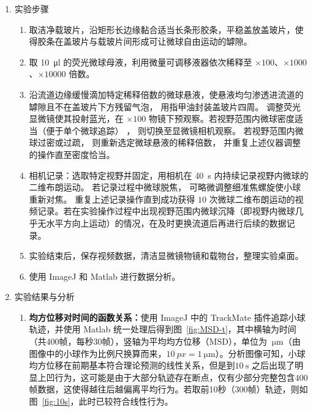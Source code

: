 \documentclass[a4paper]{article}
\begin{document}
\begin{enumerate}[label=\chinese*.,left=0pt]
    \item 实验步骤
    \begin{enumerate}[label=\arabic*.,left = 0pt]
        \item 取洁净载玻片，沿矩形长边缘黏合适当长条形胶条，平稳盖放盖玻片，使得胶条在盖玻片与载玻片间形成可让微球自由运动的罅隙。
        \item 取 \qty{10}{\micro \litre} 的荧光微球母液，利用微量可调移液器依次稀释至 $\times100$、$\times1000$、$\times10000$ 倍数。
        \item 沿流道边缘缓慢滴加特定稀释倍数的微球悬液，使悬液均匀渗透进流道的罅隙且不在盖玻片下方残留气泡， 用指甲油封装盖玻片四周。 调整荧光显微镜使其投射蓝光，在 $\times100$ 物镜下预观察。若视野范围内微球密度适当（便于单个微球追踪） ， 则切换至显微镜相机观察。 若视野范围内微球过密或过疏， 则重新选定微球悬液的稀释倍数， 并重复上述仪器调整的操作直至密度恰当。
        \item 相机记录：选取特定视野并固定，用相机在 \qty{40}{\second} 内持续记录视野内微球的二维布朗运动。 若记录过程中微球脱焦， 可略微调整细准焦螺旋使小球重新对焦。 重复上述记录操作直到成功获得 $10$ 次微球二维布朗运动的视频记录。若在实验操作过程中出现视野范围内微球沉降（即视野内微球几乎无水平方向上运动）的情况，在及时更换流道后再进行后续的数据记录。
        \item 实验结束后，保存视频数据，清洁显微镜物镜和载物台，整理实验桌面。
        \item 使用 ImageJ 和 Matlab 进行数据分析。
    \end{enumerate}

    
    \item 实验结果与分析
        \begin{enumerate}[label=\arabic*.,left = 0pt]
            \item \textbf{均方位移对时间的函数关系：}使用 ImageJ 中的 TrackMate 插件追踪小球轨迹，并使用 Matlab 统一处理后得到图~\ref{fig:MSD-t}，其中横轴为时间（共400帧，每秒30帧），竖轴为平均均方位移（MSD），单位为 $\qty{}{\micro \m}$（由图像中的小球作为比例尺换算而来，$\qty{10}{px} = \qty{1}{\micro \m}$）。分析图像可知，小球均方位移在前期基本符合理论预测的线性关系，但是到$\qty{10}{\s}$ 之后出现了明显上凹行为，这可能是由于大部分轨迹存在断点，仅有少部分完整包含400帧数据，这使得越往后越偏离平均行为。若取前10秒（300帧）轨迹，则如图~\ref{fig:10s}，此时已较符合线性行为。\\
            

\end{enumerate}
\end{enumerate}
\end{document}
